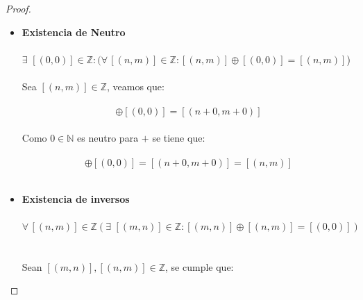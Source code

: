 \documentclass[11pt,letterpaper]{article}
\newcommand{\N}{\mathbb{N}}
\newcommand{\Z}{\mathbb{Z}}
\begin{document}
\begin{proof}
\begin{itemize}
        $\forall\,\,[(n,m)],[(r,s)],[(t,u)]\in \Z:(\,[(n,m)]\oplus(\,[(r,s)\oplus[(t,u)]]\,)=(\,[(n,m)]\oplus[(r,s)]\,)\oplus[(t,u)]\,)$\,\\
        \,\\
        Sean $[(n,m)],[(r,s)],[(t,u)]\in \Z$, tenemos que:\,\\
        \,\\
        \begin{equation*}
            [(n,m)]\oplus(\,[(r,s)\oplus[(t,u)]]\,)=[(n+(r+t),m+(s+u))]
        \end{equation*}\,\\
        Debido a que $+$ es asociativa en $\N$:\,\\
    
        \begin{equation*}
            [(n,m)]\oplus(\,[(r,s)\oplus[(t,u)]]\,)=[(n+(r+t),m+(s+u))]=[((n+r)+t,(m+s)+u)]=(\,[(n,m)]\oplus[(r,s)]\,)\oplus[(t,u)]
        \end{equation*}\,\\
        \item \textbf{Existencia de Neutro}\,\\
        \,\\
        $\exists\,\,[(0,0)]\in \Z:(\forall\,[(n,m)]\in \Z:[(n,m)]\oplus[(0,0)]=[(n,m)]$)\,\\
        \,\\
        Sea $[(n,m)]\in \Z$, veamos que:\,\\
        \,\\
        \begin{equation*}
            [(n,m)]\oplus [(0,0)]=[(n+0,m+0)]
        \end{equation*}\,\\
        Como $0\in \N$ es neutro para $+$ se tiene que:\,\\
        \,\\
        \begin{equation*}
            [(n,m)]\oplus[(0,0)]=[(n+0,m+0)]=[(n,m)]
        \end{equation*}\,\\
        \item \textbf{Existencia de inversos}\,\\
        \,\\
        $\forall\,[(n,m)]\in \Z(\exists\,\,[(m,n)]\in \Z: [(m,n)]\oplus [(n,m)]=[(0,0)])$\,\\
        \,\\
        Sean $[(m,n)],[(n,m)]\in \Z$, se cumple que:\,\\

\end{itemize}
\end{proof}
\end{document}

